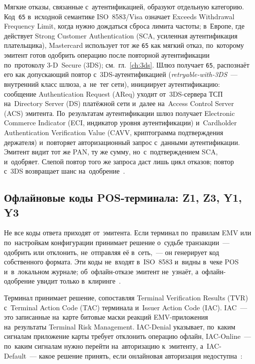 Мягкие отказы, связанные с~аутентификацией, образуют отдельную категорию.
Код~\texttt{65} в~исходной семантике ISO~8583/Visa означает Exceeds Withdrawal
Frequency Limit, когда нужно дождаться сброса лимита частоты; в~Европе,
где действует Strong Customer Authentication (SCA, усиленная аутентификация
плательщика), Mastercard использует тот же \texttt{65} как мягкий отказ, по~которому эмитент готов одобрить операцию после повторной
аутентификации по~протоколу 3-D~Secure (3DS); см.~гл.~\ref{ch:3ds}. Шлюз
получает \texttt{65}, распознаёт его как допускающий повтор
с~3DS-аутентификацией (\textit{retryable-with-3DS}~--- внутренний класс шлюза,
а~не~тег сети), инициирует аутентификацию: сообщение Authentication Request
(AReq) уходит от~3DS-сервера ТСП на~Directory Server (DS) платёжной сети
и~далее на~Access Control Server (ACS) эмитента. По~результатам аутентификации
шлюз получает Electronic Commerce Indicator (ECI, индикатор уровня
аутентификации) и~Cardholder Authentication Verification Value (CAVV,
криптограмма подтверждения держателя) и~повторяет авторизационный запрос
с~данными аутентификации. Эмитент видит тот же PAN, ту же сумму,
но~с~подтверждением SCA, и~одобряет. Слепой повтор того же запроса даст лишь
цикл отказов; повтор с~3DS возвращает шанс на~одобрение~\cite{mc-tpr}.


\subsection*{Офлайновые коды POS-терминала: Z1, Z3, Y1, Y3}\label{sec:decline-offline-rc}

Не все коды ответа приходят от~эмитента. Если терминал по~правилам EMV или
по~настройкам конфигурации принимает решение о~судьбе транзакции~---
одобрить или отклонить, не~отправляя её в~сеть,~--- он генерирует код
собственного формата. Эти коды не~входят в~ISO~8583 и~видны в~чеке POS
и~в~локальном журнале; об~офлайн-отказе эмитент не~узнаёт, а~офлайн-одобрение
увидит только в~клиринге~\cite{emvco-book4}.

Терминал принимает решение, сопоставляя Terminal Verification Results (TVR)
с~Terminal Action Code (TAC)
терминала и~Issuer Action Code (IAC). IAC~--- это записанные
на~карте битовые маски реакций EMV-приложения на~результаты Terminal Risk
Management. IAC-Denial указывает, по~каким сигналам приложение карты требует
отклонить операцию офлайн, IAC-Online~--- по~каким сигналам нужно перейти
на~авторизацию к~эмитенту, а~IAC-Default~--- какое решение принять, если
онлайновая авторизация недоступна~\cite{emvco-book3}:

